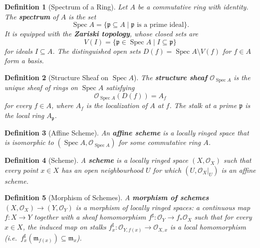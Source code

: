 \documentclass{article}
\newtheorem{definition}{Definition}
\begin{document}
\begin{definition}[Spectrum of a Ring]
Let $A$ be a commutative ring with identity. The \textbf{spectrum} of $A$ is the set
\[
    \operatorname{Spec} A = \{ \mathfrak{p} \subseteq A \mid \mathfrak{p} \text{ is a prime ideal} \}.
\]
It is equipped with the \textbf{Zariski topology}, whose closed sets are
\[
    V(I) = \{ \mathfrak{p} \in \operatorname{Spec} A \mid I \subseteq \mathfrak{p} \}
\]
for ideals $I \subseteq A$. The distinguished open sets $D(f) = \operatorname{Spec} A \setminus V(f)$ for $f \in A$ form a basis.
\end{definition}

\begin{definition}[Structure Sheaf on $\operatorname{Spec} A$]
The \textbf{structure sheaf} $\mathcal{O}_{\operatorname{Spec} A}$ is the unique sheaf of rings on $\operatorname{Spec} A$ satisfying
\[
    \mathcal{O}_{\operatorname{Spec} A}(D(f)) = A_f
\]
for every $f \in A$, where $A_f$ is the localization of $A$ at $f$. The stalk at a prime $\mathfrak{p}$ is the local ring $A_{\mathfrak{p}}$.
\end{definition}

\begin{definition}[Affine Scheme]
An \textbf{affine scheme} is a locally ringed space that is isomorphic to $(\operatorname{Spec} A, \mathcal{O}_{\operatorname{Spec} A})$ for some commutative ring $A$.
\end{definition}

\begin{definition}[Scheme]
A \textbf{scheme} is a locally ringed space $(X, \mathcal{O}_X)$ such that every point $x \in X$ has an open neighbourhood $U$ for which $(U, \mathcal{O}_X|_U)$ is an affine scheme.
\end{definition}

\begin{definition}[Morphism of Schemes]
A \textbf{morphism of schemes} $(X, \mathcal{O}_X) \to (Y, \mathcal{O}_Y)$ is a morphism of locally ringed spaces: a continuous map $f \colon X \to Y$ together with a sheaf homomorphism $f^\sharp \colon \mathcal{O}_Y \to f_*\mathcal{O}_X$ such that for every $x \in X$, the induced map on stalks $f^\sharp_x \colon \mathcal{O}_{Y,f(x)} \to \mathcal{O}_{X,x}$ is a local homomorphism (i.e.\ $f^\sharp_x(\mathfrak{m}_{f(x)}) \subseteq \mathfrak{m}_x$).
\end{definition}
\end{document}
